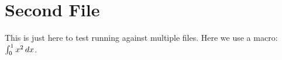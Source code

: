 \section{Second File}

This is just here to test running against multiple files.
Here we use a macro: $\int_0^1 x^2\, dx$.